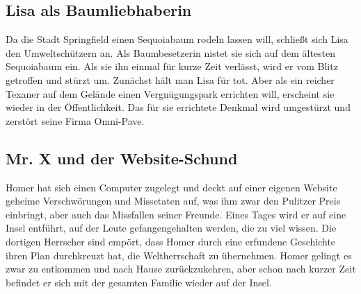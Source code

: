 \subsection{Lisa als Baumliebhaberin}
Da die Stadt Springfield einen Sequoiabaum rodeln lassen will, schließt sich Lisa den Umweltschützern an. Als Baumbesetzerin nistet sie sich auf dem ältesten Sequoiabaum ein. Als sie ihn einmal für kurze Zeit verlässt, wird er vom Blitz getroffen und stürzt um. Zunächst hält man Lisa für tot. Aber als ein reicher Texaner auf dem Gelände einen Vergnügungspark errichten will, erscheint sie wieder in der Öffentlichkeit. Das für sie errichtete Denkmal wird umgestürzt und zerstört seine Firma Omni-Pave.


\subsection{Mr. X und der Website-Schund}\label{CABF02}
Homer hat sich einen Computer zugelegt und deckt auf einer eigenen Website geheime Verschwörungen und Missetaten auf, was ihm zwar den Pulitzer Preis einbringt, aber auch das Missfallen seiner Freunde. Eines Tages wird er auf eine Insel entführt, auf der Leute gefangengehalten werden, die zu viel wissen. Die dortigen Herrscher sind empört, dass Homer durch eine erfundene Geschichte ihren Plan durchkreuzt hat, die Weltherrschaft zu übernehmen. Homer gelingt es zwar zu entkommen und nach Hause zurückzukehren, aber schon nach kurzer Zeit befindet er sich mit der gesamten Familie wieder auf der Insel.


